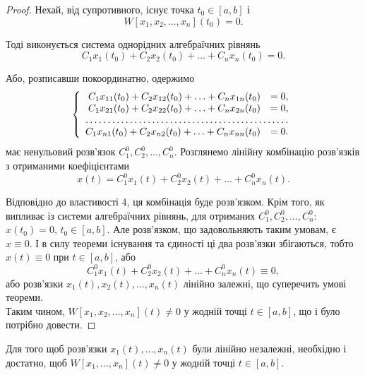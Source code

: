 \begin{proof}
	Нехай, від супротивного, існує точка $t_0 \in [a, b]$ і \[W[x_1, x_2, \ldots, x_n](t_0) = 0.\]

	Тоді виконується система однорідних алгебраїчних рівнянь \[C_1 x_1(t_0) + C_2 x_2(t_0) + \ldots + C_n x_n(t_0) = 0. \]

	Або, розписавши покоординатно, одержимо
	\begin{equation*}
		\left\{
			\begin{array}{rl}
				C_1 x_{11}(t_0) + C_2 x_{12}(t_0) + \ldots + C_n x_{1n}(t_0) &= 0, \\
				C_1 x_{21}(t_0) + C_2 x_{22}(t_0) + \ldots + C_n x_{2n}(t_0) &= 0, \\
				\hdotsfor{2} \\
				C_1 x_{n1}(t_0) + C_2 x_{n2}(t_0) + \ldots + C_n x_{nn}(t_0) &= 0.
			\end{array}
		\right.
	\end{equation*}
 	має ненульовий розв'язок $C_1^0, C_2^0, \ldots, C_n^0$. Розглянемо лінійну комбінацію розв'язків з отриманими коефіцієнтами
 	\begin{equation*}
 		x(t) = C_1^0 x_1(t) + C_2^0 x_2(t) + \ldots + C_n^0 x_n(t).
 	\end{equation*}

	Відповідно до властивості 4, ця комбінація буде розв'язком. Крім того, як випливає із системи алгебраїчних рівнянь, для отриманих $C_1^0, C_2^0, \ldots, C_n^0$: $x(t_0) = 0$, $t_0 \in [a, b]$. Але розв'язком, що задовольняють таким умовам, є $x \equiv 0$. І в силу теореми існування та єдиності ці два розв'язки збігаються, тобто $x(t) \equiv 0$ при $t \in [a, b]$, або 
 	\begin{equation*}
 		C_1^0 x_1(t) + C_2^0 x_2(t) + \ldots + C_n^0 x_n(t) \equiv 0,
 	\end{equation*}
	або розв'язки $x_1(t), x_2(t), \ldots, x_n(t)$ лінійно залежні, що суперечить умові теореми.  \\

	Таким чином, $W[x_1, x_2, \ldots, x_n](t) \ne 0$ у жодній точці $t \in [a, b]$, що і було потрібно довести.
\end{proof}

\begin{theorem}
	Для того щоб розв'язки $x_1(t), \ldots, x_n(t)$ були лінійно незалежні, необхідно і достатно, щоб $W[x_1, \ldots, x_n](t) \ne 0$ у жодній точці $t \in [a, b]$.
\end{theorem}

